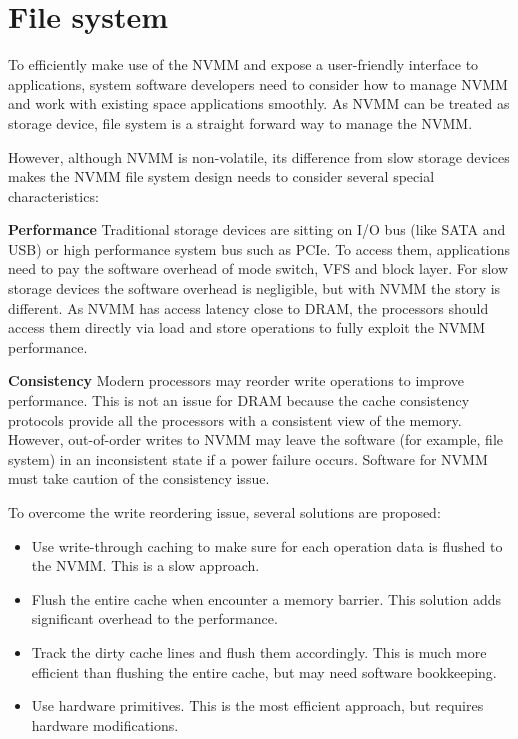 \section{File system} 
\label{sec:fs}

To efficiently make use of the NVMM and expose a user-friendly
interface to applications, system software developers need to consider
how to manage NVMM and work with existing space applications smoothly.
As NVMM can be treated as storage device, file system is a straight forward
way to manage the NVMM.

However, although NVMM is non-volatile, its difference from slow storage
devices makes the NVMM file system design needs to consider several special
characteristics:


\textbf{Performance} Traditional storage devices are sitting on I/O bus
(like SATA and USB) or high performance system bus such as PCIe. To access
them, applications need to pay the software overhead of mode switch, VFS and
block layer. For slow storage devices the software overhead is negligible,
but with NVMM the story is different. As NVMM has access latency close to
DRAM, the processors should access them directly via load and store
operations to fully exploit the NVMM performance.



\textbf{Consistency} Modern processors may reorder write operations to improve
performance. This is not an issue for DRAM because the cache consistency
protocols provide all the processors with a consistent view of the memory.
However, out-of-order writes to NVMM may leave the software (for example,
file system) in an inconsistent state if a power failure occurs. Software
for NVMM must take caution of the consistency issue. 

To overcome the write reordering issue, several solutions are proposed:

\begin{itemize}
\item Use write-through caching to make sure for each operation
data is flushed to the NVMM. This is a slow approach. 
\item Flush the entire cache when encounter a memory barrier. This solution
adds significant overhead to the performance.
\item Track the dirty cache lines and flush them accordingly. This is much
more efficient than flushing the entire cache, but may need software bookkeeping.
\item Use hardware primitives. This is the most efficient approach, but requires
hardware modifications.
\end{itemize}

